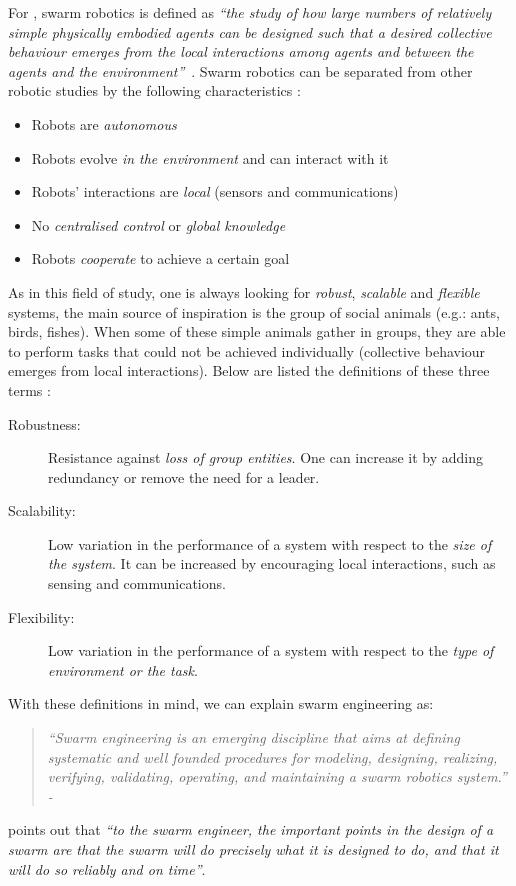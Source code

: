 \documentclass[oneside, a4paper, 12pt]{memoir}
\newcommand{\quoto}[2]{
\begin{quotation}
\textit{\enquote{#1} - #2}
\end{quotation}
}
\newcommand{\quot}[1]{\textit{\enquote{#1}}}
\begin{document}
			For \citet{csahin2005swarm}, swarm robotics is defined as \quot{the study of how large numbers of relatively simple physically embodied agents can be designed such that a desired collective behaviour emerges from the local interactions among agents and between the agents and the environment}~\citep{csahin2005swarm}. Swarm robotics can be separated from other robotic studies by the following characteristics \citep{brambilla2013swarm}:
		\begin{itemize}
			\item Robots are \emph{autonomous}
			\item Robots evolve \emph{in the environment} and can interact with it
			\item Robots' interactions are \emph{local} (sensors and communications)
			\item No \emph{centralised control} or \emph{global knowledge}
			\item Robots \emph{cooperate} to achieve a certain goal
			\end{itemize}
			As in this field of study, one is always looking for \emph{robust}, \emph{scalable} and \emph{flexible} systems, the main source of inspiration is the group of social animals (e.g.: ants, birds, fishes). When some of these simple animals gather in groups, they are able to perform tasks that could not be achieved individually (collective behaviour emerges from local interactions). Below are listed the definitions of these three terms \citep{brambilla2013swarm}:
			\label{def:robustness_scalability_flexibility}
			\begin{description}
			\item[Robustness:] Resistance against \emph{loss of group entities}. One can increase it by adding redundancy or remove the need for a leader.
			\item[Scalability:] Low variation in the performance of a system with respect to the \emph{size of the system}. It can be increased by encouraging local interactions, such as sensing and communications.
			\item[Flexibility:] Low variation in the performance of a system with respect to the \emph{type of environment or the task}.
		\end{description}
		With these definitions in mind, we can explain swarm engineering as:
		\quoto{Swarm engineering is an emerging discipline that aims at defining systematic and well founded procedures for modeling, designing, realizing, verifying, validating, operating, and maintaining a swarm robotics system.}{\cite{brambilla2013swarm}}
		\citet{kazadi2000swarm} points out that \quot{to the swarm engineer, the important points in the design of a swarm are that the swarm will do precisely what it is designed to do, and that it will do so reliably and on time}.
		
\end{document}
